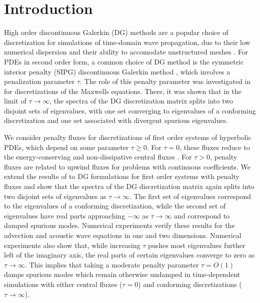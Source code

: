 \documentclass[preprint,10pt]{elsarticle}
\begin{document}
\section{Introduction}

High order discontinuous Galerkin (DG) methods are a popular choice of discretization for simulations of time-domain wave propagation, due to their low numerical dispersion and their ability to accomodate unstructured meshes \cite{grote2006discontinuous,hesthaven2007nodal}.  For PDEs in second order form, a common choice of DG method is the symmetric interior penalty (SIPG) discontinuous Galerkin method \cite{riviere2008discontinuous}, which involves a penalization parameter $\tau$.  The role of this penalty parameter was investigated in \cite{Warburton20063205} for discretizations of the Maxwells equations.  There, it was shown that in the limit of $\tau\rightarrow\infty$, the spectra of the DG discretization matrix splits into two disjoint sets of eigenvalues, with one set converging to eigenvalues of a conforming discretization and one set associated with divergent spurious eigenvalues.  

We consider penalty fluxes for discretizations of first order systems of hyperbolic PDEs, which depend on some parameter $\tau \geq 0$.  For $\tau = 0$, these fluxes reduce to the energy-conserving and non-dissipative central fluxes \cite{fezoui2005convergence}.  For $\tau > 0$, penalty fluxes are related to upwind fluxes for problems with continuous coefficients.  We extend the results of \cite{Warburton20063205} to DG formulations for first order systems with penalty fluxes and show that the spectra of the DG discretization matrix again splits into two disjoint sets of eigenvalues as $\tau\rightarrow\infty$.  The first set of eigenvalues correspond to the eigenvalues of a conforming discretization, while the second set of eigenvalues have real parts approaching $-\infty$ as $\tau\rightarrow \infty$ and correspond to damped spurious modes.  Numerical experiments verify these results for the advection and acoustic wave equations in one and two dimensions.  Numerical experiments also show that, while increasing $\tau$ pushes most eigenvalues further left of the imaginary axis, the real parts of certain eigenvalues converge to zero as $\tau\rightarrow\infty$.  This implies that taking a moderate penalty parameter $\tau = O(1)$ damps spurious modes which remain otherwise undamped in time-dependent simulations with either central fluxes ($\tau = 0$) and conforming discretizations ($\tau \rightarrow \infty$).  
\end{document}
